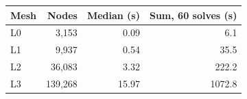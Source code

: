 \begin{tabular}{lrrr}\toprule
Mesh & Nodes & Median (s) & Sum, 60 solves (s)\\\midrule
L0 & 3,153 & 0.09 & 6.1 \\
L1 & 9,937 & 0.54 & 35.5 \\
L2 & 36,083 & 3.32 & 222.2 \\
L3 & 139,268 & 15.97 & 1072.8 \\
\bottomrule\end{tabular}
